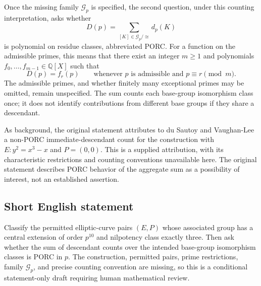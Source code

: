 \documentclass[11pt]{article}
\newcommand{\Q}{\mathbb{Q}}
\begin{document}
Once the missing family \(\mathcal G_p\) is specified, the second question, under this counting interpretation, asks whether
\[
D(p)=\sum_{[K]\in\mathcal G_p/\cong}d_p(K)
\]
is polynomial on residue classes, abbreviated PORC. For a function on the admissible primes, this means that there exist an integer \(m\ge1\) and polynomials \(f_0,\ldots,f_{m-1}\in\Q[X]\) such that
\[
D(p)=f_r(p)\qquad\text{whenever }p\text{ is admissible and }p\equiv r\pmod m.
\]
The admissible primes, and whether finitely many exceptional primes may be omitted, remain unspecified. The sum counts each base-group isomorphism class once; it does not identify contributions from different base groups if they share a descendant.

As background, the original statement attributes to du Sautoy and Vaughan-Lee a non-PORC immediate-descendant count for the construction with \(E:y^2=x^3-x\) and \(P=(0,0)\). This is a supplied attribution, with its characteristic restrictions and counting conventions unavailable here. The original statement describes PORC behavior of the aggregate sum as a possibility of interest, not an established assertion.
\subsection{Short English statement}
Classify the permitted elliptic-curve pairs \((E,P)\) whose associated group has a central extension of order \(p^{10}\) and nilpotency class exactly three. Then ask whether the sum of descendant counts over the intended base-group isomorphism classes is PORC in \(p\). The construction, permitted pairs, prime restrictions, family \(\mathcal G_p\), and precise counting convention are missing, so this is a conditional statement-only draft requiring human mathematical review.
\end{document}
